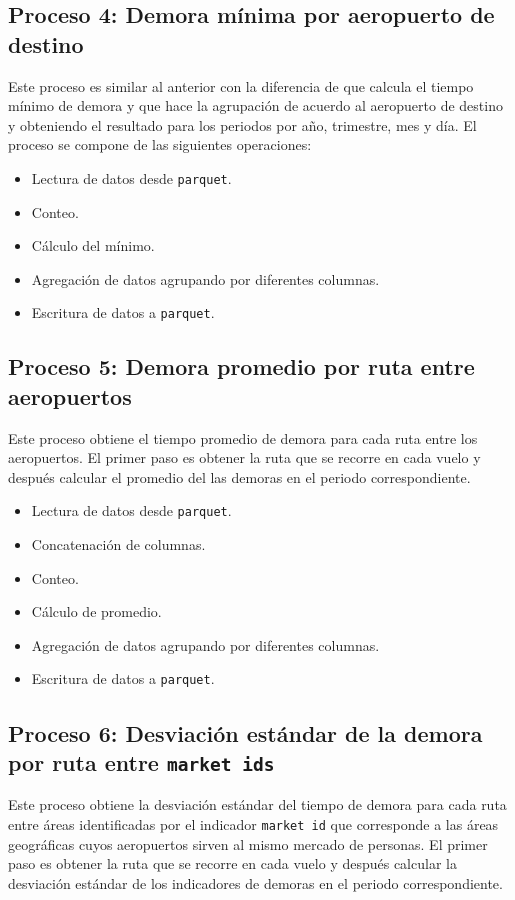 \subsection{Proceso 4: Demora mínima por aeropuerto de destino}

Este proceso es similar al anterior con la diferencia de que calcula el tiempo mínimo de demora y que hace la agrupación de acuerdo al aeropuerto de destino y obteniendo el resultado para los periodos por año, trimestre, mes y día. El proceso se compone de las siguientes operaciones:

\begin{itemize}
	\item Lectura de datos desde \texttt{parquet}.
	\item Conteo.
	\item Cálculo del mínimo.
	\item Agregación de datos agrupando por diferentes columnas.
	\item Escritura de datos a \texttt{parquet}.
\end{itemize}

\subsection{Proceso 5: Demora promedio por ruta entre aeropuertos}

Este proceso obtiene el tiempo promedio de demora para cada ruta entre los aeropuertos. El primer paso es obtener la ruta que se recorre en cada vuelo y después calcular el promedio del las demoras en el periodo correspondiente.

\begin{itemize}
	\item Lectura de datos desde \texttt{parquet}.
	\item Concatenación de columnas.
	\item Conteo.
	\item Cálculo de promedio.
	\item Agregación de datos agrupando por diferentes columnas.
	\item Escritura de datos a \texttt{parquet}.
\end{itemize}

\subsection{Proceso 6: Desviación estándar de la demora por ruta entre \texttt{market ids}}

Este proceso obtiene la desviación estándar del tiempo de demora para cada ruta entre áreas identificadas por el indicador \texttt{market id} que corresponde a las áreas geográficas cuyos aeropuertos sirven al mismo mercado de personas. El primer paso es obtener la ruta que se recorre en cada vuelo y después calcular la desviación estándar de los indicadores de demoras en el periodo correspondiente.

